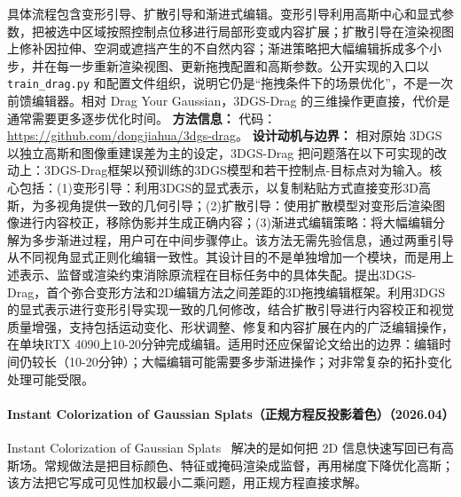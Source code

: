 具体流程包含变形引导、扩散引导和渐进式编辑。变形引导利用高斯中心和显式参数，把被选中区域按照控制点位移进行局部形变或内容扩展；扩散引导在渲染视图上修补因拉伸、空洞或遮挡产生的不自然内容；渐进策略把大幅编辑拆成多个小步，并在每一步重新渲染视图、更新拖拽配置和高斯参数。公开实现的入口以 \texttt{train\_drag.py} 和配置文件组织，说明它仍是“拖拽条件下的场景优化”，不是一次前馈编辑器。相对 Drag Your Gaussian，3DGS-Drag 的三维操作更直接，代价是通常需要更多逐步优化时间。
\textbf{方法信息：} 代码：\url{https://github.com/dongjiahua/3dgs-drag}。
\textbf{设计动机与边界：} 相对原始 3DGS 以独立高斯和图像重建误差为主的设定，3DGS-Drag 把问题落在以下可实现的改动上：3DGS-Drag框架以预训练的3DGS模型和若干控制点-目标点对为输入。核心包括：(1)变形引导：利用3DGS的显式表示，以复制粘贴方式直接变形3D高斯，为多视角提供一致的几何引导；(2)扩散引导：使用扩散模型对变形后渲染图像进行内容校正，移除伪影并生成正确内容；(3)渐进式编辑策略：将大幅编辑分解为多步渐进过程，用户可在中间步骤停止。该方法无需先验信息，通过两重引导从不同视角显式正则化编辑一致性。其设计目的不是单独增加一个模块，而是用上述表示、监督或渲染约束消除原流程在目标任务中的具体失配。提出3DGS-Drag，首个弥合变形方法和2D编辑方法之间差距的3D拖拽编辑框架。利用3DGS的显式表示进行变形引导实现一致的几何修改，结合扩散引导进行内容校正和视觉质量增强，支持包括运动变化、形状调整、修复和内容扩展在内的广泛编辑操作，在单块RTX 4090上10-20分钟完成编辑。适用时还应保留论文给出的边界：编辑时间仍较长（10-20分钟）；大幅编辑可能需要多步渐进操作；对非常复杂的拓扑变化处理可能受限。
\paragraph{Instant Colorization of Gaussian Splats（正规方程反投影着色）（2026.04）}
Instant Colorization of Gaussian Splats~\cite{2604_17155} 解决的是如何把 2D 信息快速写回已有高斯场。常规做法是把目标颜色、特征或掩码渲染成监督，再用梯度下降优化高斯；该方法把它写成可见性加权最小二乘问题，用正规方程直接求解。

